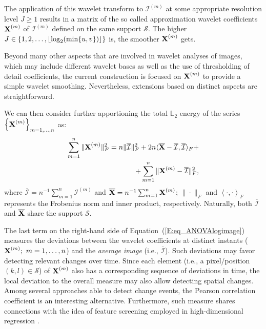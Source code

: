 \documentclass[journal]{IEEEtran}
\newcommand{\vX}{{\textbf X}}
\DeclarePairedDelimiter\floor{\lfloor}{\rfloor}
\begin{document}
The application of this wavelet transform to $\mathcal{I}^{(m)}$ at some appropriate resolution level $J\geq 1$ results in a matrix of the so called approximation wavelet coefficients $\vX^{(m)}$ of $\mathcal{I}^{(m)}$ 
defined on the same support $\mathcal{S}$. The higher $J\in\{1,2,\ldots, \floor{ \log_2( \min\{u,v\} ) } \}$ is, the smoother $\vX^{(m)}$ gets.

Beyond many other aspects that are involved in wavelet analyses of images, which may include different wavelet bases as well as the use of thresholding of detail coefficients, the current construction is focused on $\vX^{(m)}$ to provide a simple wavelet smoothing. Nevertheless, extensions based on distinct aspects are straightforward.

We can then consider further apportioning the total $\mathbb{L}_2$ energy of the series $\left\{\vX^{(m)}\right\}_{m=1,\ldots,n}$ as:
\begin{equation}\label{E:eq_ANOVAlogimage}
\begin{split}
\sum_{m=1}^n\|\vX^{(m)}\|_F^2
= n\|\overline{\mathcal{I}}\|_F^2 + 2n\langle\overline{\vX}-\overline{\mathcal{I}},\overline{\mathcal{I}}\rangle_F + \\
+ \sum_{m=1}^n\|\mathcal \vX^{(m)} - \overline{\mathcal{I}}\|_F^2,
\end{split}
\end{equation}
where $\overline{\mathcal{I}}=n^{-1}\sum_{m=1}^n\mathcal{I}^{(m)}$ and $\overline{\vX}=n^{-1}\sum_{m=1}^n\vX^{(m)}$; $\| \cdot \|_F$ and $\left\langle \cdot , \cdot \right\rangle_F$ represents the Frobenius norm and inner product, respectively. Naturally, both $\overline{\mathcal{I}}$ and $\overline{\vX}$ share the support $\mathcal{S}$.


The last term on the right-hand side of Equation~(\ref{E:eq_ANOVAlogimage}) measures the deviations between the wavelet coefficients at distinct instants ($\vX^{(m)}; \ m=1,\ldots,n$) and the \textit{average image} (i.e., $\overline{\mathcal{I}}$). Such deviations may favor detecting relevant changes over time. Since each element (i.e., a pixel/position $(k,l)\in \mathcal{S}$) of $\vX^{(m)}$ also has a corresponding sequence of deviations in time, the local deviation to the overall measure may also allow detecting spatial changes. Among several approaches able to detect change events, the Pearson correlation coefficient is an interesting alternative. Furthermore, such measure shares connections with the idea of feature screening employed in high-dimensional regression \cite{fan2008sure}.
\end{document}
